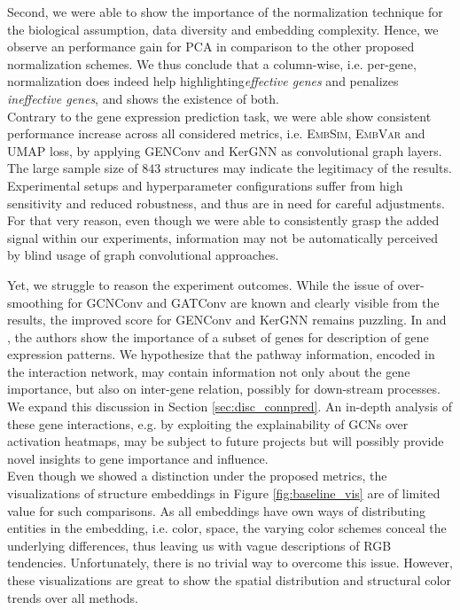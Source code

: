 \documentclass[]{article}
\begin{document}
Second, we were able to show the importance of the normalization technique for the biological assumption, data diversity and embedding complexity. Hence, we observe an performance gain for PCA in comparison to the other proposed normalization schemes. We thus conclude that a column-wise, i.e. per-gene, normalization does indeed help highlighting\textit{effective genes} and penalizes \textit{ineffective genes}, and shows the existence of both.\\

Contrary to the gene expression prediction task, we were able show consistent performance increase across all considered metrics, i.e. \textsc{EmbSim}, \textsc{EmbVar} and UMAP loss, by applying GENConv and KerGNN as convolutional graph layers. The large sample size of $843$ structures may indicate the legitimacy of the results. Experimental setups and hyperparameter configurations suffer from high sensitivity and reduced robustness, and thus are in need for careful adjustments. For that very reason, even though we were able to consistently grasp the added signal within our experiments, information may not be automatically perceived by blind usage of graph convolutional approaches.

Yet, we struggle to reason the experiment outcomes. While the issue of over-smoothing for GCNConv and GATConv are known and clearly visible from the results, the improved score for GENConv and KerGNN remains puzzling. 
In \citet{Partel2020} and \citet{bohland2010clustering}, the authors show the importance of a subset of genes for description of gene expression patterns. We hypothesize that the pathway information, encoded in the interaction network, may contain information not only about the gene importance, but also on inter-gene relation, possibly for down-stream processes. We expand this discussion in Section \ref{sec:disc_connpred}. An in-depth analysis of these gene interactions, e.g. by exploiting the explainability of GCNs over activation heatmaps, may be subject to future projects but will possibly provide novel insights to gene importance and influence. \\

Even though we showed a distinction under the proposed metrics, the visualizations of structure embeddings in Figure \ref{fig:baseline_vis} are of limited value for such comparisons. As all embeddings have own ways of distributing entities in the embedding, i.e. color, space, the varying color schemes conceal the underlying differences, thus leaving us with vague descriptions of RGB tendencies. Unfortunately, there is no trivial way to overcome this issue. However, these visualizations are great to show the spatial distribution and structural color trends over all methods.
 
\end{document}
